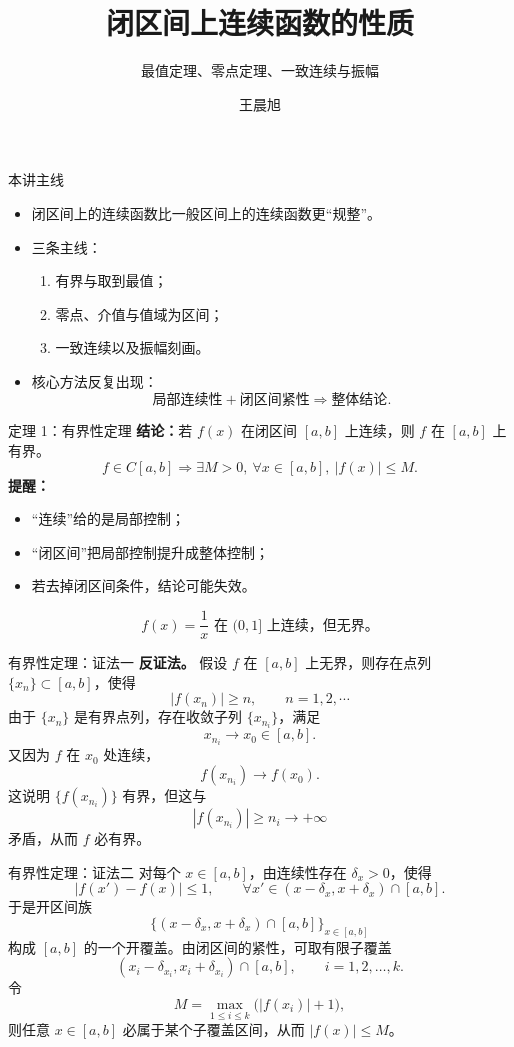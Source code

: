 ﻿\documentclass[aspectratio=169,11pt]{ctexbeamer}
\title{闭区间上连续函数的性质}
\subtitle{最值定理、零点定理、一致连续与振幅}
\author{王晨旭}
\date{}
\begin{document}
\begin{frame}
  \titlepage
\end{frame}

\begin{frame}{本讲主线}
\begin{itemize}
  \item 闭区间上的连续函数比一般区间上的连续函数更“规整”。
  \item 三条主线：
  \begin{enumerate}
    \item 有界与取到最值；
    \item 零点、介值与值域为区间；
    \item 一致连续以及振幅刻画。
  \end{enumerate}
  \item 核心方法反复出现：
  \[
    \text{局部连续性}+\text{闭区间紧性}\Longrightarrow \text{整体结论}.
  \]
\end{itemize}
\end{frame}

\begin{frame}{定理 1：有界性定理}
\textbf{结论：}若 $f(x)$ 在闭区间 $[a,b]$ 上连续，则 $f$ 在 $[a,b]$ 上有界。
\[
  f\in C[a,b]\Longrightarrow \exists M>0,\ \forall x\in[a,b],\ |f(x)|\le M.
\]
\vspace{0.5em}
\textbf{提醒：}
\begin{itemize}
  \item “连续”给的是局部控制；
  \item “闭区间”把局部控制提升成整体控制；
  \item 若去掉闭区间条件，结论可能失效。
\end{itemize}
\[
  f(x)=\frac1x \text{ 在 }(0,1]\text{ 上连续，但无界。}
\]
\end{frame}

\begin{frame}{有界性定理：证法一}
\textbf{反证法。} 假设 $f$ 在 $[a,b]$ 上无界，则存在点列 $\{x_n\}\subset[a,b]$，使得
\[
  |f(x_n)|\ge n,\qquad n=1,2,\cdots
\]
由于 $\{x_n\}$ 是有界点列，存在收敛子列 $\{x_{n_i}\}$，满足
\[
  x_{n_i}\to x_0\in[a,b].
\]
又因为 $f$ 在 $x_0$ 处连续，
\[
  f(x_{n_i})\to f(x_0).
\]
这说明 $\{f(x_{n_i})\}$ 有界，但这与
\[
  |f(x_{n_i})|\ge n_i\to+\infty
\]
矛盾，从而 $f$ 必有界。
\end{frame}

\begin{frame}{有界性定理：证法二}
对每个 $x\in[a,b]$，由连续性存在 $\delta_x>0$，使得
\[
  |f(x')-f(x)|\le 1,\qquad \forall x'\in(x-\delta_x,x+\delta_x)\cap[a,b].
\]
于是开区间族
\[
  \bigl\{(x-\delta_x,x+\delta_x)\cap[a,b]\bigr\}_{x\in[a,b]}
\]
构成 $[a,b]$ 的一个开覆盖。由闭区间的紧性，可取有限子覆盖
\[
  (x_i-\delta_{x_i},x_i+\delta_{x_i})\cap[a,b],\qquad i=1,2,\dots,k.
\]
令
\[
  M=\max_{1\le i\le k}\bigl(|f(x_i)|+1\bigr),
\]
则任意 $x\in[a,b]$ 必属于某个子覆盖区间，从而 $|f(x)|\le M$。
\end{frame}
\end{document}
